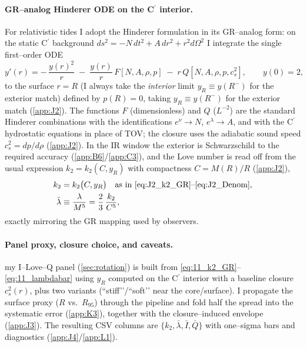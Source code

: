 \documentclass{iopjournal}
\begin{document}
\paragraph{GR–analog Hinderer ODE on the C$^\prime$ interior.}
For relativistic tides I adopt the Hinderer formulation \cite{Hinderer2008,BinningtonPoisson2009,DamourNagar2009} in its GR–analog form: on the static C$^\prime$ background $ds^2=-N\,dt^2+A\,dr^2+r^2d\Omega^2$ I integrate the single first–order ODE
\begin{equation}
y'(r)= -\,\frac{y(r)^2}{r} \;-\; \frac{y(r)}{r}\,F[N,A,\rho,p]
\;-\; r\,Q[N,A,\rho,p,c_s^2],
\qquad y(0)=2,
\label{eq:11_yODE}
\end{equation}
to the surface $r=R$ (I always take the \emph{interior} limit $y_R\equiv y(R^-)$ for the exterior match) defined by $p(R)=0$, taking $y_R\equiv y(R^-)$ for the exterior match (\cref{app:J2}). The functions $F$ (dimensionless) and $Q$ ($L^{-2}$) are the standard Hinderer combinations with the identifications $e^{\nu}\!\to N$, $e^{\lambda}\!\to A$, and with the C$^\prime$ hydrostatic equations in place of TOV; the closure uses the adiabatic sound speed $c_s^2=dp/d\rho$ (\cref{app:J2}). In the IR window the exterior is Schwarzschild to the required accuracy (\cref{app:B6}/\cref{app:C3}), and the Love number is read off from the usual expression $k_2=k_2(C,y_R)$ with compactness $C=M(R)/R$ (\cref{app:J2}),
\begin{align}
k_2 &= k_2\big(C,y_R\big)\quad\text{as in \eqref{eq:J2_k2_GR}–\eqref{eq:J2_Denom}},\label{eq:11_k2_GR}\\
\bar\lambda&\equiv\frac{\lambda}{M^5}=\frac{2}{3}\,\frac{k_2}{C^5},\label{eq:11_lambdabar}
\end{align}
exactly mirroring the GR mapping used by observers.

\paragraph{Panel proxy, closure choice, and caveats.}
my I–Love–Q panel (\cref{sec:rotation}) is built from \eqref{eq:11_k2_GR}–\eqref{eq:11_lambdabar} using $y_R$ computed on the C$^\prime$ interior with a baseline closure $c_s^2(r)$, plus two variants (``stiff’’/``soft’’ near the core/surface). I propagate the surface proxy ($R$ vs.\ $R_{95}$) through the pipeline and fold half the spread into the systematic error (\cref{app:K3}), together with the closure–induced envelope (\cref{app:J3}). The resulting CSV columns are $\{k_2,\bar\lambda,\bar{I},\bar{Q}\}$ with one–sigma bars and diagnostics (\cref{app:J4}/\cref{app:L1}).
\end{document}
